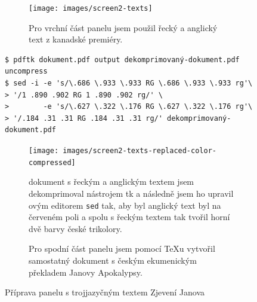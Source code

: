 \begin{figure}[p]
\begin{subfigure}{\linewidth}
\centering
\texttt{[image: images/screen2-texts]}
\caption{Pro vrchní část panelu jsem použil řecký a anglický text z kanadské premiéry.~\cite{morland2018fantasia}}
\label{fig:screen2-texts-greek-and-english-original}
\end{subfigure}
\par\vspace{5pt}
\begingroup
\small
\begin{verbatim}
$ pdftk dokument.pdf output dekomprimovaný-dokument.pdf uncompress
$ sed -i -e 's/\.686 \.933 \.933 RG \.686 \.933 \.933 rg'\
> '/1 .890 .902 RG 1 .890 .902 rg/' \
>        -e 's/\.627 \.322 \.176 RG \.627 \.322 \.176 rg'\
> '/.184 .31 .31 RG .184 .31 .31 rg/' dekomprimovaný-dokument.pdf
\end{verbatim}
\endgroup
\par\vspace{2.5pt}
\begin{subfigure}{\linewidth}
\centering
\texttt{[image: images/screen2-texts-replaced-color-compressed]}
\caption{ dokument s řeckým a anglickým textem jsem dekomprimoval nástrojem \acro{PDF}tk a následně jsem ho upravil ovým editorem \texttt{sed} tak, aby byl anglický text byl na červeném poli a spolu s řeckým textem tak tvořil horní dvě barvy české trikolory.}
\label{fig:screen2-texts-greek-and-english-updated}
\end{subfigure}
\par\vspace{10pt}
\begin{subfigure}{\linewidth}
\centering
{}
\caption{Pro spodní část panelu jsem pomocí \TeX u vytvořil samostatný dokument s českým ekumenickým překladem Janovy Apokalypsy.}
\label{fig:screen2-texts-czech}
\end{subfigure}
\caption{Příprava panelu s trojjazyčným textem Zjevení Janova}
\label{fig:screen2-texts}
\end{figure}